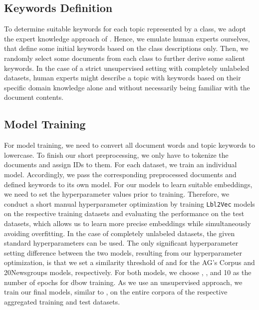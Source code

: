 \documentclass[a4paper,twoside]{article}
\begin{document}
\subsection{Keywords Definition}
To determine suitable keywords for each topic represented by a class, we adopt the expert knowledge approach of \citet{haj-yahia-etal-2019-towards}. Hence, we emulate human experts ourselves, that define some initial keywords based on the class descriptions only. Then, we randomly select some documents from each class to further derive some salient keywords. In the case of a strict unsupervised setting with completely unlabeled datasets, human experts might describe a topic with keywords based on their specific domain knowledge alone and without necessarily being familiar with the document contents. 

\subsection{Model Training}
For model training, we need to convert all document words and topic keywords to lowercase. To finish our short preprocessing, we only have to tokenize the documents and assign IDs to them. For each dataset, we train an individual model. Accordingly, we pass the corresponding preprocessed documents and defined keywords to its own model. For our models to learn suitable embeddings, we need to set the hyperparameter values prior to training. Therefore, we conduct a short manual hyperparameter optimization by training \texttt{Lbl2Vec} models on the respective training datasets and evaluating the performance on the test datasets, which allows us to learn more precise embeddings while simultaneously avoiding overfitting. In the case of completely unlabeled datasets, the given standard hyperparameters can be used. The only significant hyperparameter setting difference between the two models, resulting from our hyperparameter optimization, is that we set a similarity threshold of  and  for the AG's Corpus and 20Newsgroups models, respectively. For both models, we choose , , and 10 as the number of epochs for \ac{dbow} training. As we use an unsupervised approach, we train our final models, similar to \citet{haj-yahia-etal-2019-towards}, on the entire corpora of the respective aggregated training and test datasets.
\end{document}
